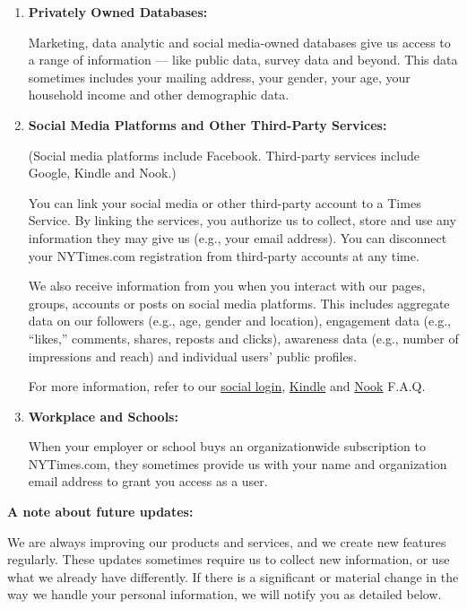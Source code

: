 \begin{enumerate}
\def\labelenumi{\arabic{enumi}.}
\item
  \textbf{Privately Owned Databases:}

  Marketing, data analytic and social media-owned databases give us
  access to a range of information --- like public data, survey data and
  beyond. This data sometimes includes your mailing address, your
  gender, your age, your household income and other demographic data.
\item
  \textbf{Social Media Platforms and Other Third-Party Services:}

  (Social media platforms include Facebook. Third-party services include
  Google, Kindle and Nook.)

  You can link your social media or other third-party account to a Times
  Service. By linking the services, you authorize us to collect, store
  and use any information they may give us (e.g., your email address).
  You can disconnect your NYTimes.com registration from third-party
  accounts at any time.

  We also receive information from you when you interact with our pages,
  groups, accounts or posts on social media platforms. This includes
  aggregate data on our followers (e.g., age, gender and location),
  engagement data (e.g., ``likes,'' comments, shares, reposts and
  clicks), awareness data (e.g., number of impressions and reach) and
  individual users' public profiles.

  For more information, refer to our
  \href{https://help.nytimes3xbfgragh.onion/hc/en-us/articles/115014887628-Social-login}{social
  login},
  \href{https://help.nytimes3xbfgragh.onion/hc/en-us/articles/115014889068-Kindle-subscribers}{Kindle}
  and
  \href{https://help.nytimes3xbfgragh.onion/hc/en-us/articles/115014917867-NOOK-subscribers}{Nook}
  F.A.Q.
\item
  \textbf{Workplace and Schools:}

  When your employer or school buys an organizationwide subscription to
  NYTimes.com, they sometimes provide us with your name and organization
  email address to grant you access as a user.
\end{enumerate}

\textbf{A note about future updates:}

We are always improving our products and services, and we create new
features regularly. These updates sometimes require us to collect new
information, or use what we already have differently. If there is a
significant or material change in the way we handle your personal
information, we will notify you as detailed below.

